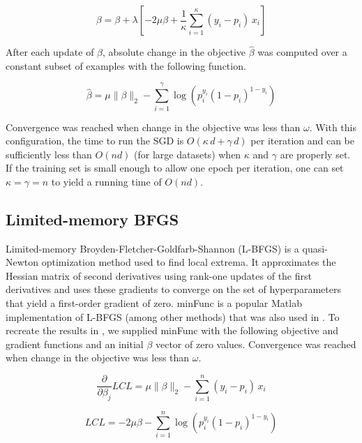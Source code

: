 \documentclass[10pt]{article}
\begin{document}
\begin{equation}\label{SGD_grad}
    \beta = \beta + \lambda [-2 \mu \beta + \frac{1}{\kappa}\sum_{i=1}^{\kappa}{(y_i - p_i)\,x_i}]
\end{equation}

After each update of $\beta$, absolute change in the objective $\widehat{\beta}$ was computed over a constant subset of examples with the following function.

\begin{equation}\label{SGD_obj}
    \widehat{\beta} = \mu \|\beta\|_2 - \sum_{i=1}^{\gamma}{\log(p_i^{y_i}(1 - p_i)^{1-y_i})}
\end{equation}

Convergence was reached when change in the objective was less than $\omega$. With this configuration, the time to run the SGD is $O(\kappa\,d + \gamma\,d)$ per iteration and can be sufficiently less than $O(nd)$ (for large datasets) when $\kappa$ and $\gamma$ are properly set. If the training set is small enough to allow one epoch per iteration, one can set $\kappa = \gamma = n$ to yield a running time  of $O(nd)$.


\subsection{Limited-memory BFGS}
Limited-memory Broyden-Fletcher-Goldfarb-Shannon (L-BFGS) is a quasi-Newton optimization method used to find local extrema. It approximates the Hessian matrix of second derivatives using rank-one updates of the first derivatives and uses these gradients to converge on the set of hyperparameters that yield a first-order gradient of zero. minFunc is a popular Matlab implementation of L-BFGS (among other methods) that was also used in \cite{t-logistic}. To recreate the results in \cite{t-logistic}, we supplied minFunc with the following objective and gradient functions and an initial $\beta$ vector of zero values. Convergence was reached when change in the objective was less than $\omega$.

\begin{equation}\label{LBFGS_grad}
    \frac{\partial}{\partial \beta_j}LCL = \mu \|\beta\|_2 - \sum_{i=1}^{n}{(y_i - p_i)\,x_i}
\end{equation}

\begin{equation}\label{LBFGS_obj}
    LCL = -2 \mu \beta - \sum_{i=1}^{n}{\log(p_i^{y_i}(1 - p_i)^{1-y_i})}
\end{equation}
\end{document}
